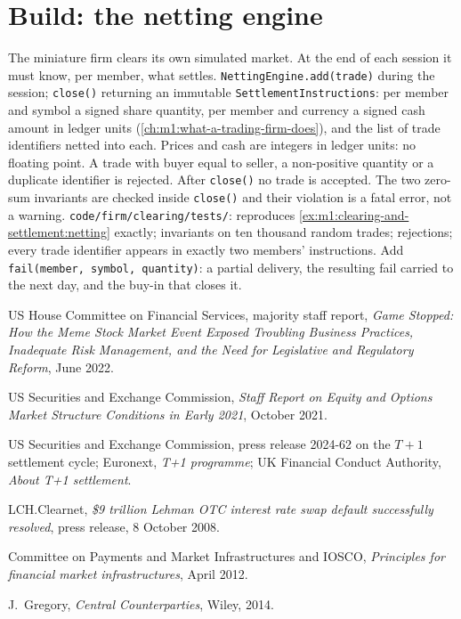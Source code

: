 \section{Build: the netting engine}\label{bld:m1:clearing-and-settlement:netting}

\begin{build}
 The miniature firm clears its own simulated market. At the
end of each session it must know, per member, what settles.
 \texttt{NettingEngine.add(trade)} during the session;
\texttt{close()} returning an immutable \texttt{SettlementInstructions}:
per member and symbol a signed share quantity, per member and currency a
signed cash amount in ledger units (\cref{ch:m1:what-a-trading-firm-does}),
and the list of trade identifiers netted into each.
 Prices and cash are integers in ledger units: no floating
point. A trade with buyer equal to seller, a non-positive quantity or a
duplicate identifier is rejected. After \texttt{close()} no trade is
accepted. The two zero-sum invariants are checked inside \texttt{close()}
and their violation is a fatal error, not a warning.
 \texttt{code/firm/clearing/tests/}: reproduces
\cref{ex:m1:clearing-and-settlement:netting} exactly; invariants on ten
thousand random trades; rejections; every trade identifier appears in exactly
two members' instructions.
 Add \texttt{fail(member, symbol, quantity)}: a partial
delivery, the resulting fail carried to the next day, and the buy-in that
closes it.
\end{build}

\begin{omsources}
\item US House Committee on Financial Services, majority staff report,
\emph{Game Stopped: How the Meme Stock Market Event Exposed Troubling
Business Practices, Inadequate Risk Management, and the Need for Legislative
and Regulatory Reform}, June 2022.
\item US Securities and Exchange Commission, \emph{Staff Report on Equity and
Options Market Structure Conditions in Early 2021}, October 2021.
\item US Securities and Exchange Commission, press release 2024-62 on the
$T{+}1$ settlement cycle; Euronext, \emph{T+1 programme}; UK Financial
Conduct Authority, \emph{About T+1 settlement}.
\item LCH.Clearnet, \emph{\$9 trillion Lehman OTC interest rate swap default
successfully resolved}, press release, 8 October 2008.
\item Committee on Payments and Market Infrastructures and IOSCO,
\emph{Principles for financial market infrastructures}, April 2012.
\item J.~Gregory, \emph{Central Counterparties}, Wiley, 2014.
\end{omsources}

